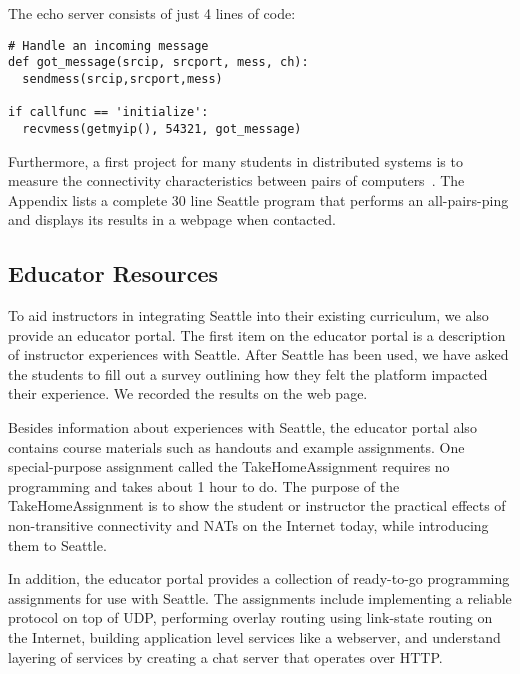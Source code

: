 The echo server consists of just 4 lines of code:

{\scriptsize
\begin{verbatim}
# Handle an incoming message
def got_message(srcip, srcport, mess, ch):
  sendmess(srcip,srcport,mess)

if callfunc == 'initialize':
  recvmess(getmyip(), 54321, got_message)  
\end{verbatim}
}


Furthermore, a first project for many students in distributed systems is to 
measure the connectivity characteristics between pairs of
computers~\cite{AllPairsPing}.  The Appendix lists a complete 30 line Seattle
program that performs an all-pairs-ping and displays its results in a webpage 
when contacted.


\subsection{Educator Resources}

To aid instructors in integrating Seattle into their existing curriculum, 
we also provide an educator portal.   The first item on the educator 
portal is a description of instructor experiences with Seattle.   After
Seattle has been used, we have asked the students to fill out a survey 
outlining how they felt the platform impacted their experience.   We recorded
the results on the web page.

Besides information about experiences with Seattle, the educator portal also 
contains course materials such as handouts and example assignments.   
One special-purpose assignment called the TakeHomeAssignment requires 
no programming and takes about 1 hour to do.   The purpose of the 
TakeHomeAssignment is to show the student or instructor the practical effects 
of non-transitive connectivity and NATs on the Internet today, while 
introducing them to Seattle.

In addition, the educator portal provides a collection of ready-to-go 
programming assignments for use with Seattle.   The assignments include implementing a 
reliable protocol on top of UDP, performing overlay routing using link-state 
routing on the Internet, building application level services like a webserver, and 
understand layering of services by creating a chat server that operates 
over HTTP.   

